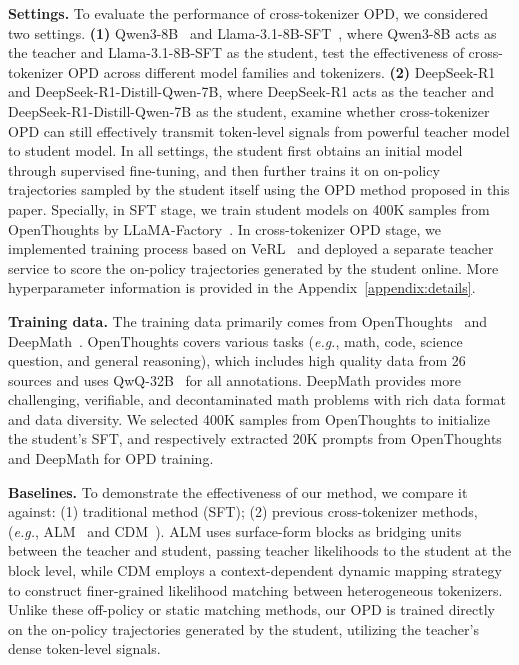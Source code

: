 \documentclass{article}
\theoremstyle{plain}
\theoremstyle{definition}
\theoremstyle{remark}
\begin{document}
\textbf{Settings.} To evaluate the performance of cross-tokenizer OPD, we considered two settings. \textbf{(1)} Qwen3-8B~\cite{yang2025qwen3technicalreport} and Llama-3.1-8B-SFT~\cite{grattafiori2024llama3herdmodels}, where Qwen3-8B acts as the teacher and Llama-3.1-8B-SFT as the student, test the effectiveness of cross-tokenizer OPD across different model families and tokenizers. \textbf{(2)} DeepSeek-R1~\cite{Guo_2025} and DeepSeek-R1-Distill-Qwen-7B, where DeepSeek-R1 acts as the teacher and DeepSeek-R1-Distill-Qwen-7B as the student, examine whether cross-tokenizer OPD can still effectively transmit token‑level signals from powerful teacher model to student model.
In all settings, the student first obtains an initial model through supervised fine-tuning, and then further trains it on on-policy trajectories sampled by the student itself using the OPD method proposed in this paper. Specially, in SFT stage, we train student models on 400K samples from OpenThoughts by LLaMA-Factory~\cite{zheng2024llamafactoryunifiedefficientfinetuning}.
In cross-tokenizer OPD stage, we implemented training process based on VeRL~\cite{sheng2024hybridflow} and deployed a separate teacher service to score the on-policy trajectories generated by the student online. More hyperparameter information is provided in the Appendix~\ref{appendix:details}.


\textbf{Training data.}
The training data primarily comes from OpenThoughts~\cite{guha2025openthoughtsdatarecipesreasoning} and DeepMath~\cite{he2025deepmath103klargescalechallengingdecontaminated}. OpenThoughts covers various tasks (\emph{e.g.}, math, code,  science question, and general reasoning), which includes high quality data from 26 sources and uses QwQ-32B~\cite{qwq32b} for all annotations.
DeepMath provides more challenging, verifiable, and decontaminated math problems with rich data format and data diversity. We selected 400K samples from OpenThoughts to initialize the student's SFT, and respectively extracted 20K prompts from OpenThoughts and DeepMath for OPD training.

\textbf{Baselines.}
To demonstrate the effectiveness of our method, we compare it against: (1) traditional method (SFT); (2) previous cross-tokenizer methods, (\emph{e.g.}, ALM~\cite{minixhofer2025universalcrosstokenizerdistillationapproximate} and CDM~\cite{Li_2024}). ALM uses surface-form blocks as bridging units between the teacher and student, passing teacher likelihoods to the student at the block level, while CDM employs a context-dependent dynamic mapping strategy to construct finer-grained likelihood matching between heterogeneous tokenizers. Unlike these off-policy or static matching methods, our OPD is trained directly on the on-policy trajectories generated by the student, utilizing the teacher's dense token-level signals. 
\end{document}
